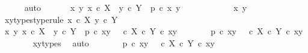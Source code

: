 \begin{isabellebody}
\ \ \ \ \isamarkupfalse%
\ auto\isanewline
\ \ \isamarkupfalse%
\ \isamarkupfalse%
\ {\isachardoublequoteopen}{\isasymAnd}\ x\ y{\isachardot}{\kern0pt}\ x\ {\isasymin}\isactrlsub c\ X\ {\isasymLongrightarrow}\ y\ {\isasymin}\isactrlsub c\ Y\ {\isasymLongrightarrow}\ p\ {\isasymcirc}\isactrlsub c\ {\isasymlangle}x{\isacharcomma}{\kern0pt}\ y{\isasymrangle}\ {\isacharequal}{\kern0pt}\ {\isasymt}{\isachardoublequoteclose}\isanewline
\ \ \isamarkupfalse%
\ {\isacharminus}{\kern0pt}\isanewline
\ \ \ \ \isamarkupfalse%
\ x\ y\isanewline
\ \ \ \ \isamarkupfalse%
\ xy{\isacharunderscore}{\kern0pt}types{\isacharbrackleft}{\kern0pt}type{\isacharunderscore}{\kern0pt}rule{\isacharbrackright}{\kern0pt}{\isacharcolon}{\kern0pt}\ {\isachardoublequoteopen}x\ {\isasymin}\isactrlsub c\ X{\isachardoublequoteclose}\ {\isachardoublequoteopen}y\ {\isasymin}\isactrlsub c\ Y{\isachardoublequoteclose}\isanewline
\ \ \ \ \isamarkupfalse%
\ {\isachardoublequoteopen}{\isasymAnd}x\ y{\isachardot}{\kern0pt}\ x\ {\isasymin}\isactrlsub c\ X\ {\isasymLongrightarrow}\ y\ {\isasymin}\isactrlsub c\ Y\ {\isasymLongrightarrow}\ p\ {\isasymcirc}\isactrlsub c\ {\isasymlangle}x{\isacharcomma}{\kern0pt}y{\isasymrangle}\ {\isacharequal}{\kern0pt}\ {\isacharparenleft}{\kern0pt}{\isasymt}\ {\isasymcirc}\isactrlsub c\ {\isasymbeta}\isactrlbsub X\ {\isasymtimes}\isactrlsub c\ Y\isactrlesub {\isacharparenright}{\kern0pt}\ {\isasymcirc}\isactrlsub c\ {\isasymlangle}x{\isacharcomma}{\kern0pt}y{\isasymrangle}{\isachardoublequoteclose}\isanewline
\ \ \ \ \isamarkupfalse%
\ \isamarkupfalse%
\ {\isachardoublequoteopen}p\ {\isasymcirc}\isactrlsub c\ {\isasymlangle}x{\isacharcomma}{\kern0pt}y{\isasymrangle}\ {\isacharequal}{\kern0pt}\ {\isacharparenleft}{\kern0pt}{\isasymt}\ {\isasymcirc}\isactrlsub c\ {\isasymbeta}\isactrlbsub X\ {\isasymtimes}\isactrlsub c\ Y\isactrlesub {\isacharparenright}{\kern0pt}\ {\isasymcirc}\isactrlsub c\ {\isasymlangle}x{\isacharcomma}{\kern0pt}y{\isasymrangle}{\isachardoublequoteclose}\isanewline
\ \ \ \ \ \ \isamarkupfalse%
\ xy{\isacharunderscore}{\kern0pt}types\ \isamarkupfalse%
\ auto\isanewline
\ \ \ \ \isamarkupfalse%
\ \isamarkupfalse%
\ {\isachardoublequoteopen}p\ {\isasymcirc}\isactrlsub c\ {\isasymlangle}x{\isacharcomma}{\kern0pt}y{\isasymrangle}\ {\isacharequal}{\kern0pt}\ {\isasymt}\ {\isasymcirc}\isactrlsub c\ {\isacharparenleft}{\kern0pt}{\isasymbeta}\isactrlbsub X\ {\isasymtimes}\isactrlsub c\ Y\isactrlesub \ {\isasymcirc}\isactrlsub c\ {\isasymlangle}x{\isacharcomma}{\kern0pt}y{\isasymrangle}{\isacharparenright}{\kern0pt}{\isachardoublequoteclose}\isanewline

\end{isabellebody}
